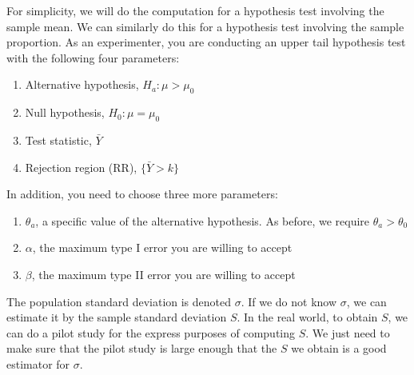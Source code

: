 \documentclass[notes.tex]{subfiles}
\begin{document}
For simplicity, we will do the computation for a hypothesis test involving the sample mean. We can similarly do this for a hypothesis test involving the sample proportion. As an experimenter, you are conducting an upper tail hypothesis test with the following four parameters:
\begin{enumerate}
\item Alternative hypothesis, $H_a: \mu > \mu_0$
\item Null hypothesis, $H_0: \mu = \mu_0$
\item Test statistic, $\bar{Y}$
\item Rejection region (RR), $\{ \bar{Y} > k \}$
\end{enumerate}
In addition, you need to choose three more parameters:
\begin{enumerate}
\item $\theta_a$, a specific value of the alternative hypothesis. As before, we require $\theta_a > \theta_0$
\item $\alpha$, the maximum type I error you are willing to accept
\item $\beta$, the maximum type II error you are willing to accept
\end{enumerate}
The population standard deviation is denoted $\sigma$. If we do not know $\sigma$, we can estimate it by the sample standard deviation $S$. In the real world, to obtain $S$, we can do a pilot study for the express purposes of computing $S$. We just need to make sure that the pilot study is large enough that the $S$ we obtain is a good estimator for $\sigma$.\\
\end{document}
